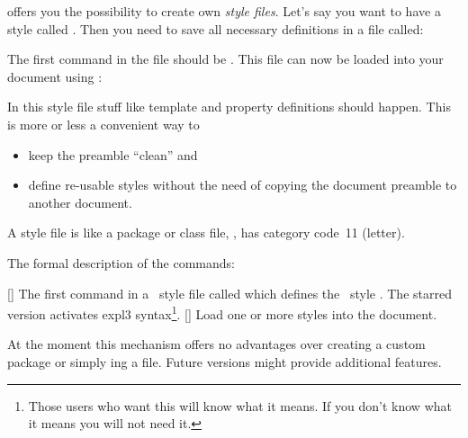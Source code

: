 \documentclass{xsim-manual}
\begin{document}
\xsim{} offers you the possibility to create own
\emph{style files}.  Let's say you want to have a style called
.  Then you need to save all necessary definitions in a file
called:
\begin{center}
\end{center}
The first command in the file should be .  This
file can now be loaded into your document using
:

In this style file stuff like template and property definitions should
happen.  This is more or less a convenient way to
\begin{itemize}
  \item keep the preamble \enquote{clean} and
  \item define re-usable styles without the need of copying the document
    preamble to another document.
\end{itemize}
A style file is like a package or class file, \ie,  has category
code~11 (letter).

The formal description of the commands:
\begin{commands}
  [\sarg{}]
    The first command in a \xsim\ style file called
     which defines the \xsim\
    style .  The starred version activates expl3
    syntax\footnote{Those users who want this will know what it means.  If you
      don't know what it means you will not need it.}.
  []
    Load one or more styles into the document.
\end{commands}

\begin{bewareofthedog}
  At the moment this mechanism offers no advantages over creating a custom
  package or simply \cs*{input}ing a file.  Future versions might provide
  additional features.
\end{bewareofthedog}

\end{document}

